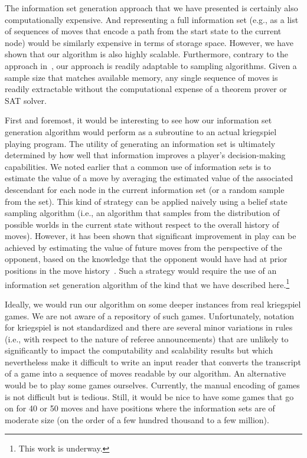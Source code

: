 \documentclass[times, 10pt,twocolumn]{article}
\begin{document}
The information set generation approach that we have presented is certainly also computationally expensive.  And
representing a full information set (e.g., as a list of sequences of moves that encode a path from the start state to
the current node) would be similarly expensive in terms of storage space.  However, we have shown that our algorithm is
also highly scalable.  Furthermore, contrary to the approach in~\cite{nance06reasoning}, our approach is readily
adaptable to sampling algorithms.  Given a sample size that matches available memory, any single sequence of moves is
readily extractable without the computational expense of a theorem prover or SAT solver.


First and foremost, it would be interesting to see how our information set generation algorithm would perform as a
subroutine to an actual kriegspiel playing program.  The utility of generating an information set is ultimately
determined by how well that information improves a player's decision-making capabilities.  We noted earlier that a
common use of information sets is to estimate the value of a move by averaging the estimated value of the associated
descendant for each node in the current information set (or a random sample from the set).  This kind of strategy can be
applied naively using a belief state sampling algorithm (i.e., an algorithm that samples from the distribution of
possible worlds in the current state without respect to the overall history of moves).  However, it has been shown that
significant improvement in play can be achieved by estimating the value of future moves from the perspective of the
opponent, based on the knowledge that the opponent would have had at prior positions in the move
history~\cite{richards07opponent}.  Such a strategy would require the use of an information set generation algorithm of the
kind that we have described here.\footnote{This work is underway.}

Ideally, we would run our algorithm on some deeper instances from real kriegspiel games.  We are not aware of a
repository of such games.  Unfortunately, notation for kriegspiel is not standardized and there are several minor
variations in rules (i.e., with respect to the nature of referee announcements) that are unlikely to significantly to
impact the computability and scalability results but which nevertheless make it difficult to write an input reader that
converts the transcript of a game into a sequence of moves readable by our algorithm.  An alternative would be to play
some games ourselves.  Currently, the manual encoding of games is not difficult but is tedious.  Still, it would be nice
to have some games that go on for 40 or 50 moves and have positions where the information sets are of moderate size (on
the order of a few hundred thousand to a few million).
\end{document}
